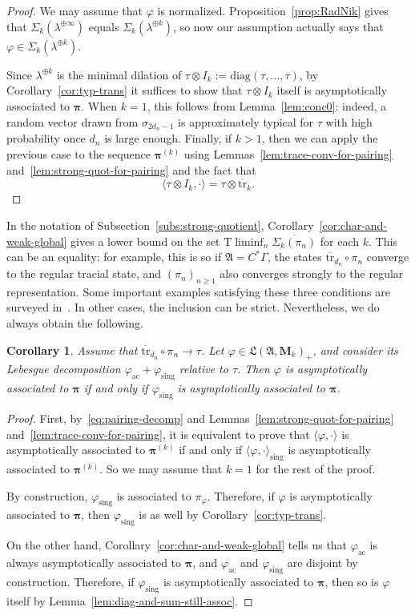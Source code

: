 \documentclass[12pt,a4paper]{article}
\numberwithin{equation}{section}
\newtheorem{cor}[thm]{Corollary}
\theoremstyle{remark}
\renewcommand{\rm}[1]{\mathrm{#1}}
\newcommand{\rmM}{\mathbf{M}}
\newcommand{\A}{\mathfrak{A}}
\newcommand{\frL}{\mathfrak{L}}
\newcommand{\G}{\Gamma}
\renewcommand{\S}{\Sigma}
\renewcommand{\phi}{\varphi}
\renewcommand{\l}{\lambda}
\newcommand{\s}{\sigma}
\newcommand{\ol}[1]{\overline{#1}}
\newcommand{\bspi}{\boldsymbol{\pi}}
\newcommand{\tr}{\overline{\mathrm{tr}}}
\begin{document}
\begin{proof}
We may assume that $\phi$ is normalized.  Proposition~\ref{prop:RadNik} gives that $\S_k(\l^{\oplus \infty})$ equals $\S_k(\l^{\oplus k})$, so now our assumption actually says that $\phi \in \ol{\S_k(\l^{\oplus k})}$.

Since $\l^{\oplus k}$ is the minimal dilation of $\tau \otimes I_k := \rm{diag}(\tau,\dots,\tau)$, by Corollary~\ref{cor:typ-trans} it suffices to show that $\tau\otimes I_k$ itself is asymptotically associated to $\bspi$.  When $k = 1$, this follows from Lemma~\ref{lem:conc0}: indeed, a random vector drawn from $\s_{2d_n-1}$ is approximately typical for $\tau$ with high probability once $d_n$ is large enough.  Finally, if $k > 1$, then we can apply the previous case to the sequence $\bspi^{(k)}$ using Lemmas~\ref{lem:trace-conv-for-pairing} and~\ref{lem:strong-quot-for-pairing} and the fact that
	\[\langle \tau\otimes I_k,\cdot\rangle = \tau\otimes \tr_k.\]
\end{proof}

In the notation of Subsection~\ref{subs:strong-quotient}, Corollary~\ref{cor:char-and-weak-global} gives a lower bound on the set $\rm{T}\liminf_n\ol{\S_k(\pi_n)}$ for each $k$.  This can be an equality: for example, this is so if $\A = C^\ast \G$, the states $\tr_{d_n}\circ \pi_n$ converge to the regular tracial state, and $(\pi_n)_{n\ge 1}$ also converges strongly to the regular representation.  Some important examples satisfying these three conditions are surveyed in~\cite{Magee--survey}.  In other cases, the inclusion can be strict.  Nevertheless, we do always obtain the following.

\begin{cor}\label{cor:singular-part-controls}
Assume that $\tr_{d_n}\circ \pi_n \to \tau$.  Let $\phi \in \frL(\A,\rmM_k)_+$, and consider its Lebesgue decomposition $\phi_{\rm{ac}} + \phi_{\rm{sing}}$ relative to $\tau$.  Then $\phi$ is asymptotically associated to $\bspi$ if and only if $\phi_{\rm{sing}}$ is asymptotically associated to $\bspi$.
\end{cor}

\begin{proof}
First, by~\eqref{eq:pairing-decomp} and Lemmas~\ref{lem:strong-quot-for-pairing} and~\ref{lem:trace-conv-for-pairing}, it is equivalent to prove that $\langle \phi,\cdot\rangle$ is asymptotically associated to $\bspi^{(k)}$ if and only if $\langle\phi,\cdot\rangle_{\rm{sing}}$ is asymptotically associated to $\bspi^{(k)}$.  So we may assume that $k=1$ for the rest of the proof.

By construction, $\phi_{\rm{sing}}$ is associated to $\pi_\phi$.  Therefore, if $\phi$ is asymptotically associated to $\bspi$, then $\phi_{\rm{sing}}$ is as well by Corollary~\ref{cor:typ-trans}.

On the other hand, Corollary~\ref{cor:char-and-weak-global} tells us that $\phi_{\rm{ac}}$ is always asymptotically associated to $\bspi$, and $\phi_{\rm{ac}}$ and $\phi_{\rm{sing}}$ are disjoint by construction.  Therefore, if $\phi_{\rm{sing}}$ is asymptotically associated to $\bspi$, then so is $\phi$ itself by Lemma~\ref{lem:diag-and-sum-still-assoc}.
\end{proof}
\end{document}
